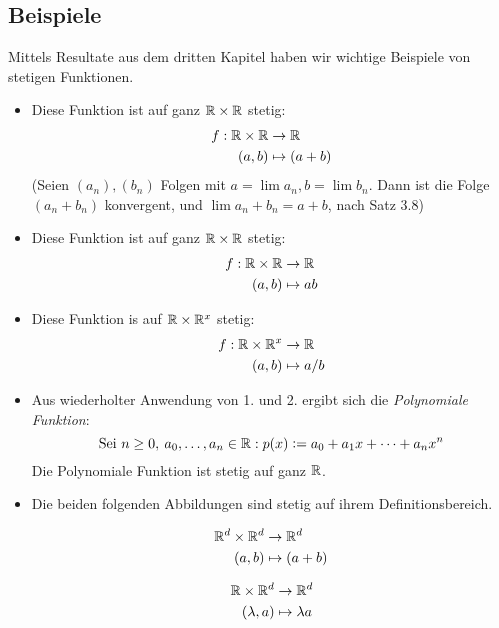 \subsection*{Beispiele}
Mittels Resultate aus dem dritten Kapitel haben wir wichtige Beispiele von stetigen Funktionen.
\begin{itemize}
\item Diese Funktion ist auf ganz $\mathbb{R}\times\mathbb{R}$ stetig: \begin{align*}f:\mathbb{R}\times\mathbb{R}&\to\mathbb{R} \\ (a,b) &\mapsto (a+b) \end{align*} (Seien $(a_{n}), (b_{n})$ Folgen mit $a = \lim{a_{n}}, b = \lim{b_{n}}$. Dann ist die Folge $(a_{n} + b_{n})$ konvergent, und $\lim{a_{n}+b_{n}} = a + b$, nach Satz 3.8) 
\item Diese Funktion ist auf ganz $\mathbb{R}\times\mathbb{R}$ stetig:
\begin{align*}f:\mathbb{R}\times\mathbb{R}&\to\mathbb{R} \\ (a,b)&\mapsto ab \end{align*}
\item Diese Funktion is auf $\mathbb{R}\times\mathbb{R}^{x}$ stetig:
\begin{align*}f:\mathbb{R}\times\mathbb{R}^{x}&\to\mathbb{R} \\ (a,b)&\mapsto a/b \end{align*}
\item Aus wiederholter Anwendung von 1. und 2. ergibt sich die \emph{Polynomiale Funktion}:
\[\text{Sei } n \geq 0,\: a_{0}, \dots, a_{n}\in\mathbb{R}: p(x)\vcentcolon= a_{0} + a_{1}x + \dots + a_{n}x^{n} \]
Die Polynomiale Funktion ist stetig auf ganz $\mathbb{R}$.
\item Die beiden folgenden Abbildungen sind stetig auf ihrem Definitionsbereich. 
\begin{figure}[htbp]
\begin{minipage}[t][4mm][b]{0.5\textwidth}
\begin{align*} \mathbb{R}^{d}\times\mathbb{R}^{d}&\to\mathbb{R}^{d} \\ (a,b)&\mapsto(a+b)\end{align*} 
\end{minipage}
\begin{minipage}[t][4mm][b]{0.5\textwidth}
\begin{align*}  \mathbb{R}\times\mathbb{R}^{d}&\to\mathbb{R}^{d} \\ (\lambda,a)&\mapsto\lambda a \end{align*}
\end{minipage}
\end{figure}


\end{itemize}
